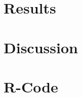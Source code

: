 \documentclass{article}
\begin{document}
  \section{Results}

  \section{Discussion}
    
  \section{R-Code}
    \begin{lstlisting}[language=R]
    \end{lstlisting}
\end{document}
